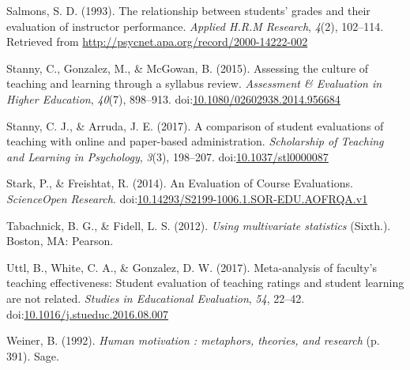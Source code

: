 \documentclass[man]{apa6}
\theoremstyle{definition}
\theoremstyle{definition}
\theoremstyle{definition}
\theoremstyle{remark}
\begin{document}
\leavevmode\hypertarget{ref-Salmons1993}{}%
Salmons, S. D. (1993). The relationship between students' grades and
their evaluation of instructor performance. \emph{Applied H.R.M
Research}, \emph{4}(2), 102--114. Retrieved from
\url{http://psycnet.apa.org/record/2000-14222-002}

\leavevmode\hypertarget{ref-Stanny2015}{}%
Stanny, C., Gonzalez, M., \& McGowan, B. (2015). Assessing the culture
of teaching and learning through a syllabus review. \emph{Assessment \&
Evaluation in Higher Education}, \emph{40}(7), 898--913.
doi:\href{https://doi.org/10.1080/02602938.2014.956684}{10.1080/02602938.2014.956684}

\leavevmode\hypertarget{ref-Stanny2017}{}%
Stanny, C. J., \& Arruda, J. E. (2017). A comparison of student
evaluations of teaching with online and paper-based administration.
\emph{Scholarship of Teaching and Learning in Psychology}, \emph{3}(3),
198--207.
doi:\href{https://doi.org/10.1037/stl0000087}{10.1037/stl0000087}

\leavevmode\hypertarget{ref-Stark2014}{}%
Stark, P., \& Freishtat, R. (2014). An Evaluation of Course Evaluations.
\emph{ScienceOpen Research}.
doi:\href{https://doi.org/10.14293/S2199-1006.1.SOR-EDU.AOFRQA.v1}{10.14293/S2199-1006.1.SOR-EDU.AOFRQA.v1}

\leavevmode\hypertarget{ref-Tabachnick2012}{}%
Tabachnick, B. G., \& Fidell, L. S. (2012). \emph{Using multivariate
statistics} (Sixth.). Boston, MA: Pearson.

\leavevmode\hypertarget{ref-Uttl2017}{}%
Uttl, B., White, C. A., \& Gonzalez, D. W. (2017). Meta-analysis of
faculty's teaching effectiveness: Student evaluation of teaching ratings
and student learning are not related. \emph{Studies in Educational
Evaluation}, \emph{54}, 22--42.
doi:\href{https://doi.org/10.1016/j.stueduc.2016.08.007}{10.1016/j.stueduc.2016.08.007}

\leavevmode\hypertarget{ref-Weiner1992}{}%
Weiner, B. (1992). \emph{Human motivation : metaphors, theories, and
research} (p. 391). Sage.
\end{document}
